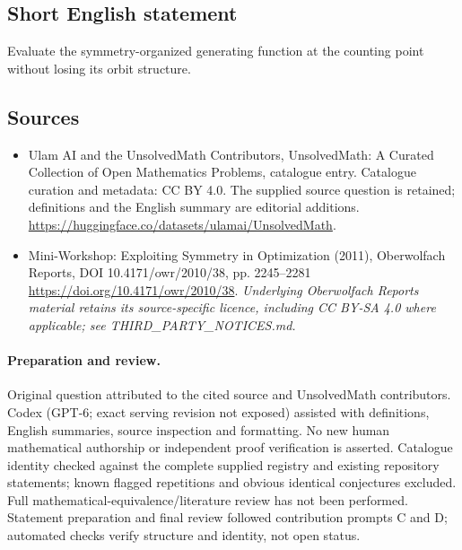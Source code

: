 \documentclass[11pt]{article}
\begin{document}
\subsection{Short English statement}
Evaluate the symmetry-organized generating function at the counting point without losing its orbit structure.
\subsection{Sources}
\begin{itemize}
\item[\hypertarget{source:statement:1}{S1}] Ulam AI and the UnsolvedMath Contributors, UnsolvedMath: A Curated Collection of Open Mathematics Problems, catalogue entry. Catalogue curation and metadata: CC BY 4.0. The supplied source question is retained; definitions and the English summary are editorial additions.
\url{https://huggingface.co/datasets/ulamai/UnsolvedMath}.
\item[\hypertarget{source:statement:2}{S2}] Mini-Workshop: Exploiting Symmetry in Optimization (2011), Oberwolfach Reports, DOI 10.4171/owr/2010/38, pp. 2245--2281
\url{https://doi.org/10.4171/owr/2010/38}.
\textit{Underlying Oberwolfach Reports material retains its source-specific licence, including CC BY-SA 4.0 where applicable; see THIRD\_PARTY\_NOTICES.md.}
\end{itemize}
\paragraph{Preparation and review.}
Original question attributed to the cited source and UnsolvedMath contributors. Codex (GPT-6; exact serving revision not exposed) assisted with definitions, English summaries, source inspection and formatting. No new human mathematical authorship or independent proof verification is asserted. Catalogue identity checked against the complete supplied registry and existing repository statements; known flagged repetitions and obvious identical conjectures excluded. Full mathematical-equivalence/literature review has not been performed. Statement preparation and final review followed contribution prompts C and D; automated checks verify structure and identity, not open status.
\label{end:statement}
\end{document}

